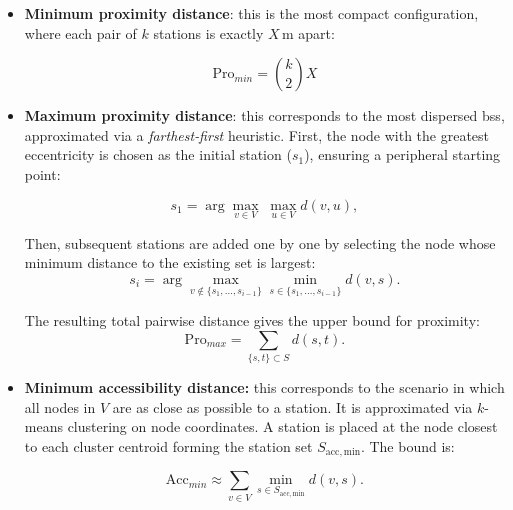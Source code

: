         \begin{itemize}
            \item \textbf{Minimum proximity distance}: this is the most compact configuration, where each pair of $k$ stations is exactly $X$\,m apart:
                
                \begin{equation}
                    \mathrm{Pro}_{min} =  \binom{k}{2}X
                        \label{eq:pro_min}
                \end{equation}

            \item \textbf{Maximum proximity distance}: this corresponds to the most dispersed \ac{bss}, approximated via a \textit{farthest‐first} heuristic. First, the node with the greatest eccentricity is  chosen as the initial station ($s_1$), ensuring a peripheral starting point:
                
                \begin{equation}
                    s_{1} = \arg\max_{v\in V}\;\max_{u\in V} d(v,u),
                    \label{eq:seed}
                \end{equation}
            
            Then, subsequent stations are added one by one by selecting the node whose minimum distance to the existing set is largest:
                \begin{equation}
                    s_i = \arg\max_{v \notin \{s_1,\dots,s_{i-1}\}} \min_{s \in \{s_1,\dots,s_{i-1}\}} d(v,s).
                    \label{eq:farthest}
                \end{equation}
            
            The resulting total pairwise distance gives the upper bound for proximity:
                \begin{equation}
                    \mathrm{Pro}_{max} = \sum_{\{s,t\} \subset S} d(s,t).
                    \label{eq:pro_max}
                \end{equation}

            \item \textbf{Minimum accessibility distance:} this corresponds to  the scenario in which all nodes in \(V\) are as close as possible to a station. It is approximated via \(k\)-means clustering on node coordinates. A station is placed at the node closest to each cluster centroid forming the station set $S_{\mathrm{acc,min}}$. The bound is:

                \begin{equation}
                    \mathrm{Acc}_{min} \approx \sum_{v\in V} \min_{s \in S_{\mathrm{acc,min}}} d(v,s).
                    \label{eq:acc_min}
                \end{equation}



\end{itemize}
